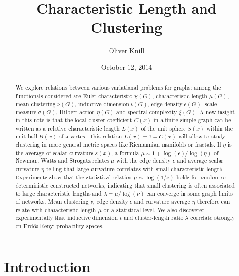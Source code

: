 \documentclass[12pt]{amsart}
\title{Characteristic Length and Clustering}
\author{Oliver Knill}
\date{October 12, 2014}
\theoremstyle{definition}
\begin{document}
\begin{abstract}
We explore relations between various variational problems for graphs: among the functionals 
considered are Euler characteristic $\chi(G)$, characteristic length $\mu(G)$, mean clustering $\nu(G)$, 
inductive dimension $\iota(G)$, edge density $\epsilon(G)$, scale measure $\sigma(G)$,
Hilbert action $\eta(G)$ and spectral complexity $\xi(G)$. A new insight in this note
is that the local cluster coefficient $C(x)$ in a finite simple graph can be written 
as a relative characteristic length $L(x)$ of the unit sphere $S(x)$ within the unit ball 
$B(x)$ of a vertex. This relation $L(x) = 2-C(x)$ will allow to study clustering 
in more general metric spaces like Riemannian manifolds or fractals. 
If $\eta$ is the average of scalar curvature $s(x)$, a formula $\mu \sim 1+\log(\epsilon)/\log(\eta)$ 
of Newman, Watts and Strogatz \cite{NewmanStrogatzWatts} relates $\mu$ with the edge 
density $\epsilon$ and average scalar curvature $
\eta$ telling that large curvature correlates with small characteristic length.
Experiments show that the statistical relation $\mu \sim \log(1/\nu)$ holds for random or 
deterministic constructed networks, indicating that small clustering is often associated to large 
characteristic lengths and $\lambda=\mu/\log(\nu)$ can converge in some graph limits of networks.
Mean clustering $\nu$, edge density $\epsilon$ and curvature average $\eta$ therefore can relate 
with characteristic length $\mu$ on a statistical level.
We also discovered experimentally that inductive dimension $\iota$ and cluster-length ratio 
$\lambda$ correlate strongly on Erd\"os-Renyi probability spaces. 
\end{abstract} 
\maketitle

\section{Introduction}
\end{document}
